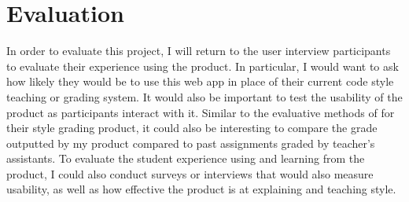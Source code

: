 \documentclass[10pt,twocolumn]{article}
\begin{document}
\section{Evaluation}
In order to evaluate this project, I will return to the user interview participants to evaluate their experience using the product. In particular, I would want to ask how likely they would be to use this web app in place of their current code style teaching or grading system. It would also be important to test the usability of the product as participants interact with it. Similar to the evaluative methods of \cite{moghadam_2015} for their style grading product, it could also be interesting to compare the grade outputted by my product compared to past assignments graded by teacher’s assistants. To evaluate the student experience using and learning from the product, I could also conduct surveys or interviews that would also measure usability, as well as how effective the product is at explaining and teaching style. 

\printbibliography 
\end{document}

